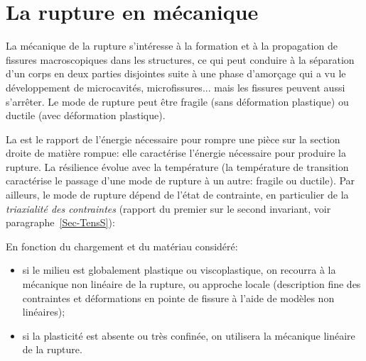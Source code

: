 \chapter{La rupture en mécanique}\label{Ch-rupt}

\ifVersionDuDocEstVincent\vspace{15mm}\fi
La mécanique de la rupture s'intéresse à la formation et à la propagation de fissures macroscopiques dans les structures, ce qui peut conduire à la séparation d'un corps en deux parties disjointes suite à une phase d'amorçage qui a vu le développement de microcavités, microfissures... mais les fissures peuvent aussi s'arrêter. Le mode de rupture peut être fragile (sans déformation plastique) ou ductile (avec déformation plastique).

\medskip
La  est le rapport de l'énergie nécessaire pour rompre une pièce sur la section droite de matière rompue: elle caractérise l'énergie nécessaire pour produire la rupture. La résilience évolue avec la température (la température de transition caractérise le passage d'une mode de rupture à un autre: fragile ou ductile). Par ailleurs, le mode de rupture dépend de l'état de contrainte, en particulier de la \emph{triaxialité des contraintes} (rapport du premier sur le second invariant, voir paragraphe~\ref{Sec-TensS}): 

\medskip
En fonction du chargement et du matériau considéré:
\begin{itemize}
  \item si le milieu est globalement plastique ou viscoplastique, on recourra à la mécanique non linéaire de la rupture, ou approche locale (description fine des contraintes et déformations en pointe de fissure à l'aide de modèles non linéaires);
  \item si la plasticité est absente ou très confinée, on utilisera la mécanique linéaire de la rupture.
\end{itemize}


\medskip
